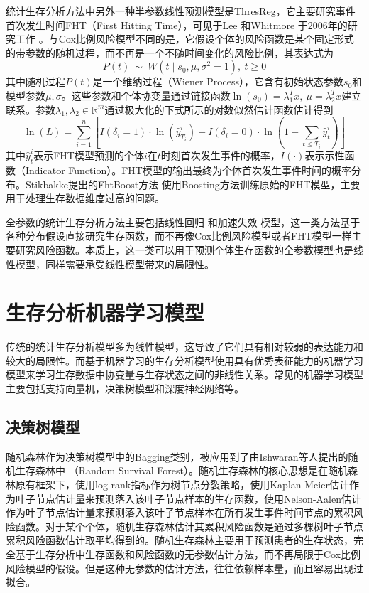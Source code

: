统计生存分析方法中另外一种半参数线性预测模型是ThresReg，它主要研究事件首次发生时间FHT（First Hitting Time），可见于Lee 和Whitmore 于2006年的研究工作 。与Cox比例风险模型不同的是，它假设个体的风险函数是某个固定形式的带参数的随机过程，而不再是一个不随时间变化的风险比例，其表达式为
\begin{equation}
P(t)\ \sim \ W(t \mid s_0, \mu, \sigma^2=1),\ t\ge 0 \label{F7}
\end{equation}
其中随机过程$P(t)$是一个维纳过程（Wiener Process），它含有初始状态参数$s_0$和模型参数$\mu, \sigma$。这些参数和个体协变量通过链接函数$\ln⁡(s_0 )=\lambda_1^T x,\ \mu = \lambda_2^T x$建立联系。参数$\lambda_1,\lambda_2\in \mathbb{R}^m$通过极大化的下式所示的对数似然估计函数估计得到
\begin{equation}
\ln(L)=\sum_{i=1}^{n} \left[ I(\delta_i=1)\cdot \ln(\hat{y}_{T_i}^i) + I(\delta_i=0) \cdot \ln(1-\sum_{t\le T_i}\hat{y}_t^i) \right] \label{F8}
\end{equation}
其中$\hat{y}_t^i$表示FHT模型预测的个体$i$在$t$时刻首次发生事件的概率，$I(\cdot)$表示示性函数（Indicator Function）。FHT模型的输出最终为个体首次发生事件时间的概率分布。Stikbakke提出的FhtBoost方法 使用Boosting方法训练原始的FHT模型，主要用于处理生存数据维度过高的问题。

全参数的统计生存分析方法主要包括线性回归 和加速失效 模型，这一类方法基于各种分布假设直接研究生存函数，而不再像Cox比例风险模型或者FHT模型一样主要研究风险函数。本质上，这一类可以用于预测个体生存函数的全参数模型也是线性模型，同样需要承受线性模型带来的局限性。

\section{生存分析机器学习模型}

传统的统计生存分析模型多为线性模型，这导致了它们具有相对较弱的表达能力和较大的局限性。而基于机器学习的生存分析模型使用具有优秀表征能力的机器学习模型来学习生存数据中协变量与生存状态之间的非线性关系。常见的机器学习模型主要包括支持向量机，决策树模型和深度神经网络等。

\subsection{决策树模型}

随机森林作为决策树模型中的Bagging类别，被应用到了由Ishwaran等人提出的随机生存森林中 （Random Survival Forest）。随机生存森林的核心思想是在随机森林原有框架下，使用log-rank指标作为树节点分裂策略，使用Kaplan-Meier估计作为叶子节点估计量来预测落入该叶子节点样本的生存函数，使用Nelson-Aalen估计作为叶子节点估计量来预测落入该叶子节点样本在所有发生事件时间节点的累积风险函数。对于某个个体，随机生存森林估计其累积风险函数是通过多棵树叶子节点累积风险函数估计取平均得到的。随机生存森林主要用于预测患者的生存状态，完全基于生存分析中生存函数和风险函数的无参数估计方法，而不再局限于Cox比例风险模型的假设。但是这种无参数的估计方法，往往依赖样本量，而且容易出现过拟合。


